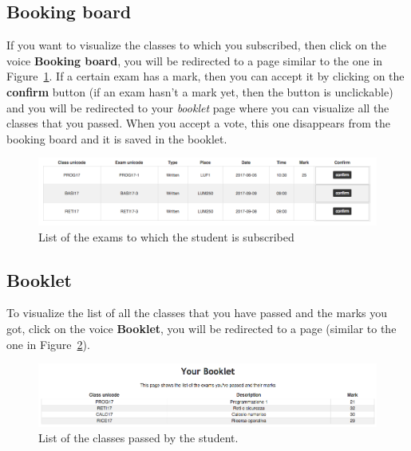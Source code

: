 \subsection{Booking board}
If you want to visualize the classes to which you subscribed, then click on the voice \textbf{Booking board}, you will be redirected to a page similar to the one in Figure~\ref{fig:studentRecords}.  If a certain exam has a mark, then you can accept it by clicking on the \textbf{confirm} button (if an exam hasn't a mark yet, then the button is unclickable) and you will be redirected to your \emph{booklet} page where you can visualize all the classes that you passed. When you accept a vote, this one disappears from the booking board and it is saved in the booklet.
\begin{figure}[H]
	\centering
	\includegraphics[width=1.0\textwidth]{img/studentRecords.png}
	\caption{List of the exams to which the student is subscribed}
	\label{fig:studentRecords}
\end{figure}

\subsection{Booklet}
To visualize the list of  all the classes that you have passed and the marks you got, click on the voice \textbf{Booklet}, you will be redirected to a page (similar to the one in Figure~\ref{fig:booklet}).
\begin{figure}[H]
	\centering
	\includegraphics[width=1.0\textwidth]{img/booklet.png}
	\caption{List of the classes passed by the student.}
	\label{fig:booklet}
\end{figure}